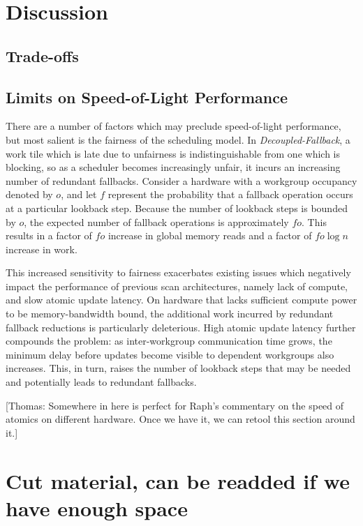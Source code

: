 \documentclass[sigconf]{acmart}
\newcommand{\thomas}[1]{{\footnotesize\color{orange}[Thomas: #1]}}
\begin{document}
\section{Discussion}

\subsection{Trade-offs}

\subsection{Limits on Speed-of-Light Performance}
There are a number of factors which may preclude speed-of-light performance, but most salient is the fairness of the scheduling model. In \emph{Decoupled-Fallback}, a work tile which is late due to unfairness is indistinguishable from one which is blocking, so as a scheduler becomes increasingly unfair, it incurs an increasing number of redundant fallbacks. Consider a hardware with a workgroup occupancy denoted by $o$, and let $f$ represent the probability that a fallback operation occurs at a particular lookback step. Because the number of lookback steps is bounded by $o$, the expected number of fallback operations is approximately $fo$. This results in a factor of $fo$ increase in global memory reads and a factor of $fo\log{n}$ increase in work.

This increased sensitivity to fairness exacerbates existing issues which negatively impact the performance of previous scan architectures, namely lack of compute, and slow atomic update latency. On hardware that lacks sufficient compute power to be memory-bandwidth bound, the additional work incurred by redundant fallback reductions is particularly deleterious. High atomic update latency further compounds the problem: as inter-workgroup communication time grows, the minimum delay before updates become visible to dependent workgroups also increases. This, in turn, raises the number of lookback steps that may be needed and potentially leads to redundant fallbacks.

\thomas{Somewhere in here is perfect for Raph's commentary on the speed of atomics on different hardware. Once we have it, we can retool this section around it.}

\section{Cut material, can be readded if we have enough space}
\end{document}
